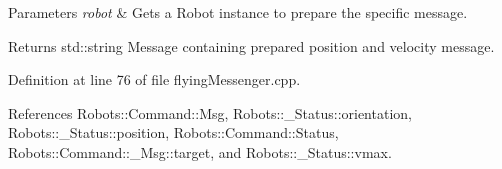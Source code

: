 \begin{DoxyParams}{Parameters}
{\em robot} & Gets a Robot instance to prepare the specific message. \\
\hline
\end{DoxyParams}
\begin{DoxyReturn}{Returns}
std\+::string Message containing prepared position and velocity message. 
\end{DoxyReturn}


Definition at line 76 of file flying\+Messenger.\+cpp.



References Robots\+::\+Command\+::\+Msg, Robots\+::\+\_\+\+Status\+::orientation, Robots\+::\+\_\+\+Status\+::position, Robots\+::\+Command\+::\+Status, Robots\+::\+Command\+::\+\_\+\+Msg\+::target, and Robots\+::\+\_\+\+Status\+::vmax.


